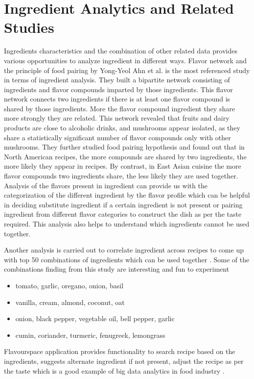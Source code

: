 \documentclass[sigconf]{acmart}
\begin{document}
\section{Ingredient Analytics and Related Studies}
Ingredients characteristics and the combination of other related data provides various opportunities to analyze ingredient in different ways. Flavor network and the principle of food pairing by Yong-Yeol Ahn et al. \cite{Ahn2011} is the most referenced study in terms of ingredient analysis. They built a bipartite network consisting of ingredients and flavor compounds imparted by those ingredients. This flavor network connects two ingredients if there is at least one flavor compound is shared by those ingredients. More the flavor compound ingredient they share more strongly they are related. This network revealed that fruits and dairy products are close to alcoholic drinks, and mushrooms appear isolated, as they share a statistically significant number of flavor compounds only with other mushrooms. They further studied food pairing hypothesis and found out that in North American recipes, the more compounds are shared by two ingredients, the more likely they appear in recipes. By contrast, in East Asian cuisine the more flavor compounds two ingredients share, the less likely they are used together. Analysis of the flavors present in ingredient can provide us with the categorization of the different ingredient by the flavor profile which can be helpful in deciding substitute ingredient if a certain ingredient is not present or pairing ingredient from different flavor categories to construct the dish as per the taste required. This analysis also helps to understand which ingredients cannot be used together. 

Another analysis is carried out to correlate ingredient across recipes to come up with top 50 combinations of ingredients which can be used together \cite{www-r-bloggers}. Some of the combinations finding from this study are interesting and fun to experiment
\begin{itemize}
\item tomato, garlic, oregano, onion, basil
\item vanilla, cream, almond, coconut, oat
\item onion, black pepper, vegetable oil, bell pepper, garlic
\item cumin, coriander, turmeric, fenugreek, lemongrass
\end{itemize}

Flavourspace application provides functionality to search recipe based on the ingredients, suggests alternate ingredient if not present, adjust the recipe as per the taste which is a good example of big data analytics in food industry \cite{www-thecul}. 
\end{document}
